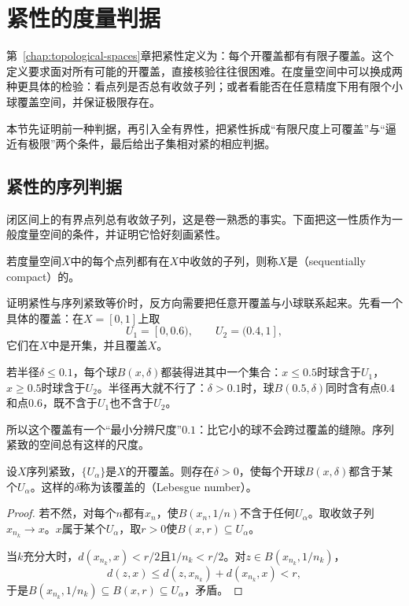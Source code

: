 \section{紧性的度量判据}
\label{sec:metric-compactness}

第~\ref{chap:topological-spaces}章把紧性定义为：每个开覆盖都有有限子覆盖。这个定义要求面对所有可能的开覆盖，直接核验往往很困难。在度量空间中可以换成两种更具体的检验：看点列是否总有收敛子列；或者看能否在任意精度下用有限个小球覆盖空间，并保证极限存在。

本节先证明前一种判据，再引入全有界性，把紧性拆成“有限尺度上可覆盖”与“逼近有极限”两个条件，最后给出子集相对紧的相应判据。

\subsection{紧性的序列判据}
\label{sec:metric-sequential-compactness}

闭区间上的有界点列总有收敛子列，这是卷一熟悉的事实。下面把这一性质作为一般度量空间的条件，并证明它恰好刻画紧性。

\begin{definition}[序列紧致]
\label{def:metric-sequentially-compact}
若度量空间$X$中的每个点列都有在$X$中收敛的子列，则称$X$是（sequentially compact）的。
\end{definition}

证明紧性与序列紧致等价时，反方向需要把任意开覆盖与小球联系起来。先看一个具体的覆盖：在$X=[0,1]$上取
\[
U_1=[0,0.6),\qquad U_2=(0.4,1],
\]
它们在$X$中是开集，并且覆盖$X$。

若半径$\delta\leq0.1$，每个球$B(x,\delta)$都装得进其中一个集合：$x\leq0.5$时球含于$U_1$，$x\geq0.5$时球含于$U_2$。半径再大就不行了：$\delta>0.1$时，球$B(0.5,\delta)$同时含有点$0.4$和点$0.6$，既不含于$U_1$也不含于$U_2$。

所以这个覆盖有一个“最小分辨尺度”$0.1$：比它小的球不会跨过覆盖的缝隙。序列紧致的空间总有这样的尺度。

\begin{lemma}[Lebesgue数]
\label{lem:metric-lebesgue-number}
设$X$序列紧致，$\{U_\alpha\}$是$X$的开覆盖。则存在$\delta>0$，使每个开球$B(x,\delta)$都含于某个$U_\alpha$。这样的$\delta$称为该覆盖的（Lebesgue number）。
\end{lemma}

\begin{proof}
若不然，对每个$n$都有$x_n$，使$B(x_n,1/n)$不含于任何$U_\alpha$。取收敛子列$x_{n_k}\to x$。$x$属于某个$U_\alpha$，取$r>0$使$B(x,r)\subseteq U_\alpha$。

当$k$充分大时，$d(x_{n_k},x)<r/2$且$1/n_k<r/2$。对$z\in B(x_{n_k},1/n_k)$，
\[
d(z,x)\leq d(z,x_{n_k})+d(x_{n_k},x)<r,
\]
于是$B(x_{n_k},1/n_k)\subseteq B(x,r)\subseteq U_\alpha$，矛盾。
\end{proof}

